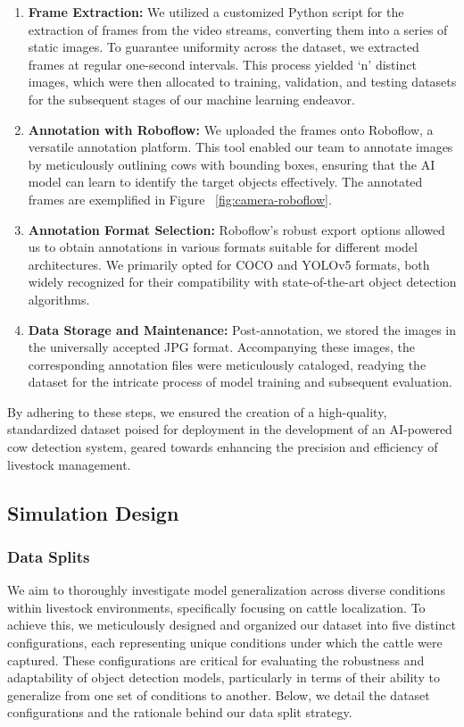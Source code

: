 \begin{enumerate}
    \item \textbf{Frame Extraction:} We utilized a customized Python script for the extraction of frames from the video streams, converting them into a series of static images. To guarantee uniformity across the dataset, we extracted frames at regular one-second intervals. This process yielded `n' distinct images, which were then allocated to training, validation, and testing datasets for the subsequent stages of our machine learning endeavor.


    \item \textbf{Annotation with Roboflow:} We uploaded the frames onto Roboflow, a versatile annotation platform. This tool enabled our team to annotate images by meticulously outlining cows with bounding boxes, ensuring that the AI model can learn to identify the target objects effectively. The annotated frames are exemplified in Figure ~\ref{fig:camera-roboflow}.

    \item \textbf{Annotation Format Selection:} Roboflow's robust export options allowed us to obtain annotations in various formats suitable for different model architectures. We primarily opted for COCO and YOLOv5 formats, both widely recognized for their compatibility with state-of-the-art object detection algorithms.

    \item \textbf{Data Storage and Maintenance:} Post-annotation, we stored the images in the universally accepted JPG format. Accompanying these images, the corresponding annotation files were meticulously cataloged, readying the dataset for the intricate process of model training and subsequent evaluation.
\end{enumerate}
By adhering to these steps, we ensured the creation of a high-quality, standardized dataset poised for deployment in the development of an AI-powered cow detection system, geared towards enhancing the precision and efficiency of livestock management.

\subsection*{Simulation Design}

\subsubsection*{Data Splits}
We aim to thoroughly investigate model generalization across diverse conditions within livestock environments, specifically focusing on cattle localization. To achieve this, we meticulously designed and organized our dataset into five distinct configurations, each representing unique conditions under which the cattle were captured. These configurations are critical for evaluating the robustness and adaptability of object detection models, particularly in terms of their ability to generalize from one set of conditions to another. Below, we detail the dataset configurations and the rationale behind our data split strategy.

